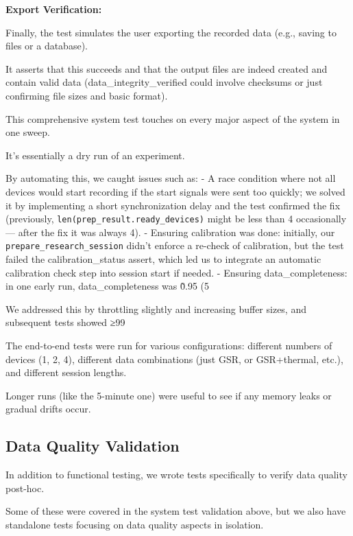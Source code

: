 {{{\textbf{Export Verification:}

Finally, the test simulates the user exporting the recorded data (e.g., saving to files or a database).

It asserts that this succeeds and that the output files are indeed created and contain valid data (data_integrity_verified could involve checksums or just confirming file sizes and basic format).

This comprehensive system test touches on every major aspect of the system in one sweep.

It's essentially a dry run of an experiment.

By automating this, we caught issues such as: - A race condition where not all devices would start recording if the start signals were sent too quickly; we solved it by implementing a short synchronization delay and the test confirmed the fix (previously, \texttt{len(prep_result.ready_devices)} might be less than 4 occasionally --- after the fix it was always 4). - Ensuring calibration was done: initially, our \texttt{prepare_research_session} didn't enforce a re-check of calibration, but the test failed the calibration_status assert, which led us to integrate an automatic calibration check step into session start if needed. - Ensuring data_completeness: in one early run, data_completeness was \~0.95 (5%

We addressed this by throttling slightly and increasing buffer sizes, and subsequent tests showed ≥99%

The end-to-end tests were run for various configurations: different numbers of devices (1, 2, 4), different data combinations (just GSR, or GSR+thermal, etc.), and different session lengths.

Longer runs (like the 5-minute one) were useful to see if any memory leaks or gradual drifts occur.

\subsection{Data Quality Validation}

In addition to functional testing, we wrote tests specifically to verify data quality post-hoc.

Some of these were covered in the system test validation above, but we also have standalone tests focusing on data quality aspects in isolation.

}}}
